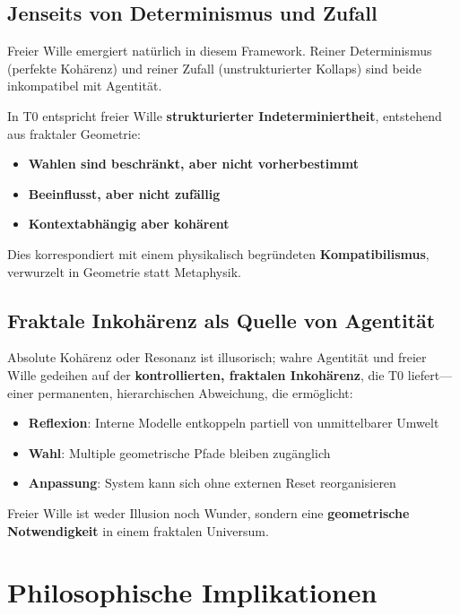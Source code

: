 	\subsection{Jenseits von Determinismus und Zufall}
	
	Freier Wille emergiert natürlich in diesem Framework. Reiner Determinismus (perfekte Kohärenz) und reiner Zufall (unstrukturierter Kollaps) sind beide inkompatibel mit Agentität.
	
	In T0 entspricht freier Wille \textbf{strukturierter Indeterminiertheit}, entstehend aus fraktaler Geometrie:
	
	\begin{itemize}
		\item \textbf{Wahlen sind beschränkt, aber nicht vorherbestimmt}
		\item \textbf{Beeinflusst, aber nicht zufällig}
		\item \textbf{Kontextabhängig aber kohärent}
	\end{itemize}
	
	Dies korrespondiert mit einem physikalisch begründeten \textbf{Kompatibilismus}, verwurzelt in Geometrie statt Metaphysik.
	
	\subsection{Fraktale Inkohärenz als Quelle von Agentität}
	
	Absolute Kohärenz oder Resonanz ist illusorisch; wahre Agentität und freier Wille gedeihen auf der \textbf{kontrollierten, fraktalen Inkohärenz}, die T0 liefert—einer permanenten, hierarchischen Abweichung, die ermöglicht:
	
	\begin{itemize}
		\item \textbf{Reflexion}: Interne Modelle entkoppeln partiell von unmittelbarer Umwelt
		\item \textbf{Wahl}: Multiple geometrische Pfade bleiben zugänglich
		\item \textbf{Anpassung}: System kann sich ohne externen Reset reorganisieren
	\end{itemize}
	
	Freier Wille ist weder Illusion noch Wunder, sondern eine \textbf{geometrische Notwendigkeit} in einem fraktalen Universum.
	
	\section{Philosophische Implikationen}
	
